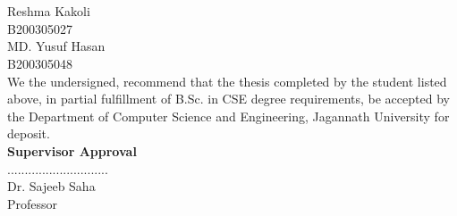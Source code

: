 \begin{titlepage}
\begin{center}
%
%
\\
\vspace*{1.0cm}
%
%
%
\\


\vspace*{1.0cm}


 Reshma Kakoli\\  [-7pt]
  B200305027\\ 
 
  MD. Yusuf Hasan\\  [-7pt]
  B200305048\\



%
We the undersigned, recommend that the thesis completed by the student listed above, in partial fulfillment of B.Sc. in CSE degree requirements, be accepted by the Department of Computer Science and Engineering, Jagannath University for deposit.\\[-5pt]
 

\vspace*{1.0cm}
\noindent \large \textbf{Supervisor Approval} \\[15pt]
............................. \\ [-5pt]
Dr. Sajeeb Saha
 \\ [-5pt]
Professor \\ [-5pt]




\end{center}
\end{titlepage}
